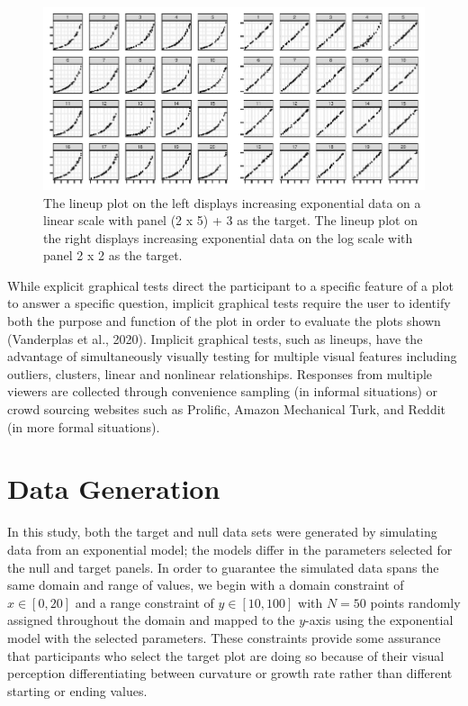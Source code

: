 \documentclass[print]{nuthesis}
\begin{document}
\begin{figure}[tbp]

{\centering \includegraphics[width=\linewidth,]{thesis_files/figure-latex/lineup-example-1} 

}

\caption[Lineup Examples]{The lineup plot on the left displays increasing exponential data on a linear scale with panel (2 x 5) + 3 as the target. The lineup plot on the right displays increasing exponential data on the log scale with panel 2 x 2 as the target.}\label{fig:lineup-example}
\end{figure}

While explicit graphical tests direct the participant to a specific feature of a plot to answer a specific question, implicit graphical tests require the user to identify both the purpose and function of the plot in order to evaluate the plots shown (Vanderplas et al., 2020).
Implicit graphical tests, such as lineups, have the advantage of simultaneously visually testing for multiple visual features including outliers, clusters, linear and nonlinear relationships. Responses from multiple viewers are collected through convenience sampling (in informal situations) or crowd sourcing websites such as Prolific, Amazon Mechanical Turk, and Reddit (in more formal situations).

\hypertarget{data-generation}{%
\section{Data Generation}\label{data-generation}}

In this study, both the target and null data sets were generated by simulating data from an exponential model; the models differ in the parameters selected for the null and target panels.
In order to guarantee the simulated data spans the same domain and range of values, we begin with a domain constraint of \(x\in [0,20]\) and a range constraint of \(y\in [10,100]\) with \(N = 50\) points randomly assigned throughout the domain and mapped to the \(y\)-axis using the exponential model with the selected parameters.
These constraints provide some assurance that participants who select the target plot are doing so because of their visual perception differentiating between curvature or growth rate rather than different starting or ending values.
\end{document}
